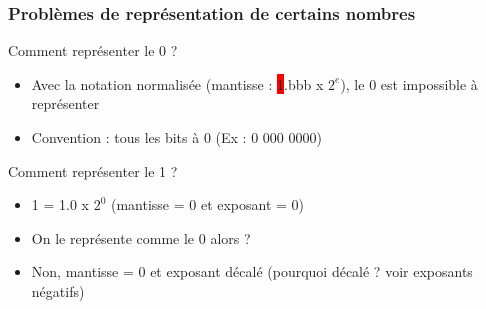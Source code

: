 \documentclass{beamer}
\begin{document}
\begin{frame}
\frametitle{Problèmes de représentation de certains nombres}

\begin{block}{Comment représenter le 0 ?}
  \begin{itemize}
  \item Avec la notation normalisée (mantisse : \colorbox{red}{1}.bbb x $2^e$), le 0
    est impossible à représenter
  \item Convention : tous les bits à 0 (Ex : 0 000 0000)
  \end{itemize}
\end{block}

\begin{block}{Comment représenter le 1 ?}
  \begin{itemize}
  \item 1 = 1.0 x $2^0$ (mantisse = 0 et exposant = 0)
  \item On le représente comme le 0 alors ?
  \item Non, mantisse = 0 et exposant décalé (pourquoi décalé ?  voir
    exposants négatifs)
  \end{itemize}
\end{block}

\end{frame}
\end{document}
